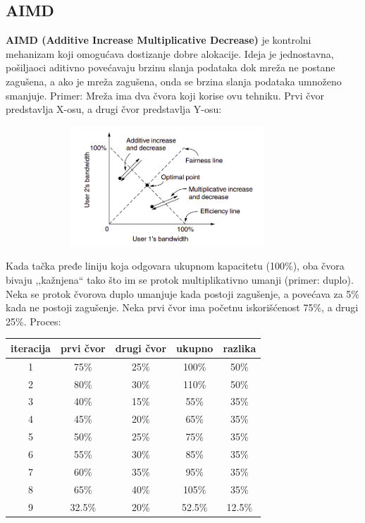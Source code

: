 \documentclass[a4paper]{article}
\begin{document}
    \subsection{AIMD }
        \textbf{AIMD (Additive Increase Multiplicative Decrease)} je kontrolni mehanizam koji omogućava dostizanje dobre alokacije. Ideja je jednostavna,
        pošiljaoci aditivno povećavaju brzinu slanja podataka dok mreža ne postane zagušena, a ako
        je mreža zagušena, onda se brzina slanja podataka umnoženo smanjuje. Primer: Mreža ima
        dva čvora koji korise ovu tehniku. Prvi čvor predstavlja X-osu, a drugi čvor predstavlja
        Y-osu: 
        \begin{figure}[H]
            \begin{center}
                \includegraphics[width=100mm,height=45mm]{Slike/tcp_zagusenje3.png}
            \end{center}
        \end{figure}
        Kada tačka pređe liniju koja odgovara ukupnom kapacitetu (100\%), oba čvora
        bivaju ,,kažnjena`` tako što im se protok multiplikativno umanji (primer: duplo). Neka se
        protok čvorova duplo umanjuje kada postoji zagušenje, a povećava za 5\% kada ne postoji 
        zagušenje. Neka prvi čvor ima početnu iskorišćenost 75\%, a drugi 25\%.
        Proces:
        \begin{table}[H]
            \begin{center}
              \label{tab:table1}
              \begin{tabular}{c|c|c|c|c} 
                \textbf{iteracija} & \textbf{prvi čvor} & \textbf{drugi čvor} & \textbf{ukupno} & \textbf{razlika}\\
                \hline
                1 & 75\% & 25\% & 100\% & 50\%\\
                2 & 80\% & 30\% & 110\% & 50\%\\
                3 & 40\% & 15\% & 55\% & 35\%\\
                4 & 45\% & 20\% & 65\% & 35\%\\
                5 & 50\% & 25\% & 75\% & 35\%\\
                6 & 55\% & 30\% & 85\% & 35\%\\
                7 & 60\% & 35\% & 95\% & 35\%\\
                8 & 65\% & 40\% & 105\% & 35\%\\
                9 & 32.5\% & 20\% & 52.5\% & 12.5\%
              \end{tabular}
            \end{center}
        \end{table}
\end{document}
